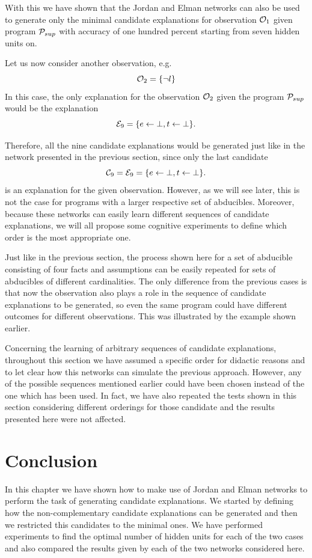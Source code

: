 With this we have shown that the Jordan and Elman networks can also be used to generate only the minimal candidate explanations for observation $\mathcal{O}_1$ given program $\mathcal{P}_{sup}$ with accuracy of one hundred percent starting from seven hidden units on. 

Let us now consider another observation, e.g.
\[
\mathcal{O}_2 = \{\neg l\}
\]
In this case, the only explanation for the observation $\mathcal{O}_2$ given the program $\mathcal{P}_{sup}$ would be the explanation
\[
\mathcal{E}_9 = \{e \leftarrow \bot, t \leftarrow \bot\}.
\]

Therefore, all the nine candidate explanations would be generated just like in the network presented in the previous section, since only the last candidate
\[
\mathcal{C}_9 = \mathcal{E}_9 = \{e \leftarrow \bot, t \leftarrow \bot\}.
\]
is an explanation for the given observation. However, as we will see later, this is not the case for programs with a larger respective set of abducibles. Moreover, because these networks can easily learn different sequences of candidate explanations, we will all propose some cognitive experiments to define which order is the most appropriate one.

Just like in the previous section, the process shown here for a set of abducible consisting of four facts and assumptions can be easily repeated for sets of abducibles of different cardinalities. The only difference from the previous cases is that now the observation also plays a role in the sequence of candidate explanations to be generated, so even the same program could have different outcomes for different observations. This was illustrated by the example shown earlier.

Concerning the learning of arbitrary sequences of candidate explanations, throughout this section we have assumed a specific order for didactic reasons and to let clear how this networks can simulate the previous approach. However, any of the possible sequences mentioned earlier could have been chosen instead of the one which has been used. In fact, we have also repeated the tests shown in this section considering different orderings for those candidate and the results presented here were not affected.

\section{Conclusion}
\label{sec:elman:conclusion}

In this chapter we have shown how to make use of Jordan and Elman networks to perform the task of generating candidate explanations. We started by defining how the non-complementary candidate explanations can be generated
 and then we restricted this candidates to the minimal ones. We have performed experiments to find the optimal number of hidden units for each of the two cases and also compared the results given by each of the two networks considered here.
 
